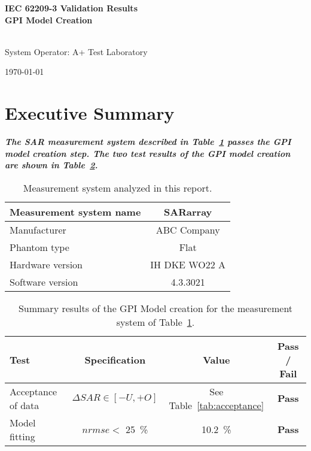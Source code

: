 \documentclass{article}
\begin{document}
\flushright
\begin{Large}
\textbf{IEC 62209-3 Validation Results} \\
\textbf{GPI Model Creation}
\end{Large} \\
System Operator: A+ Test Laboratory \\
\begin{small}
\today \\ \currenttime
\end{small}
\flushleft

\section{Executive Summary}\label{sec:exec_summary}

\textbf{\textit{The SAR measurement system described in Table~\ref{tab:system} passes the GPI model creation step. The two test results of the GPI model creation are shown in Table~\ref{tab:summary}.}}

\begin{table}[ht]\centering
\begin{tabular}{|l|c|}\hline
Measurement system name &  SARarray \\\hline
Manufacturer & ABC Company \\\hline
Phantom type & Flat \\\hline
Hardware version & IH DKE WO22 A \\\hline
Software version & 4.3.3021 \\\hline
\end{tabular}\caption{Measurement system analyzed in this report.}\label{tab:system}
\end{table}

\begin{table}[ht]\centering
\begin{tabular}{|l|c|c|c|}\hline
\textbf{Test} & \textbf{Specification} & \textbf{Value} & \textbf{Pass / Fail} \\\hline
Acceptance of data & $\Delta SAR \in [-U, +O]$ & See Table~\ref{tab:acceptance}& \textbf{Pass} \\\hline
Model fitting & $nrmse <$ 25~\%  & 10.2~\%   & \textbf{Pass} \\\hline
\end{tabular}\caption{Summary results of the GPI Model creation for the measurement system of Table~\ref{tab:system}.} \label{tab:summary}
\end{table}
\end{document}
